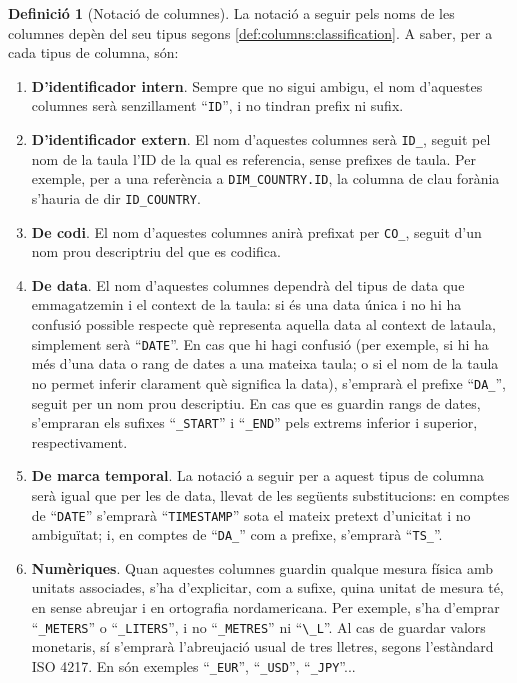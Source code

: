 \documentclass{article}
\theoremstyle{definition}
\newtheorem{definition}{Definició}
\begin{document}
\begin{definition}[Notació de columnes]\label{def:columns:notation}
La notació a seguir pels noms de les columnes depèn del seu tipus segons \cref{def:columns:classification}. A saber, per a cada tipus de columna, són:
\begin{enumerate}
  \item \textbf{D'identificador intern}. Sempre que no sigui ambigu, el nom d'aquestes columnes serà senzillament ``\verb|ID|'', i no tindran prefix ni sufix.

  \item \textbf{D'identificador extern}. El nom d'aquestes columnes serà \verb|ID_|, seguit pel nom de la taula l'ID de la qual es referencia, sense prefixes de taula. Per exemple, per a una referència a \verb|DIM_COUNTRY.ID|, la columna de clau forània s'hauria de dir \verb|ID_COUNTRY|.

  \item \textbf{De codi}. El nom d'aquestes columnes anirà prefixat per \verb|CO_|, seguit d'un nom prou descriptriu del que es codifica.

  \item \textbf{De data}. El nom d'aquestes columnes dependrà del tipus de data que emmagatzemin i el context de la taula: si és una data única i no hi ha confusió possible respecte què representa aquella data al context de lataula, simplement serà ``\verb|DATE|''. En cas que hi hagi confusió (per exemple, si hi ha més d'una data o rang de dates a una mateixa taula; o si el nom de la taula no permet inferir clarament què significa la data), s'emprarà el prefixe ``\verb|DA_|'', seguit per un nom prou descriptiu. En cas que es guardin rangs de dates, s'empraran els sufixes ``\verb|_START|'' i ``\verb|_END|'' pels extrems inferior i superior, respectivament.

  \item \textbf{De marca temporal}. La notació a seguir per a aquest tipus de columna serà igual que per les de data, llevat de les següents substitucions: en comptes de ``\verb|DATE|'' s'emprarà ``\verb|TIMESTAMP|'' sota el mateix pretext d'unicitat i no ambiguïtat; i, en comptes de ``\verb|DA_|'' com a prefixe, s'emprarà ``\verb|TS_|''.

  \item \textbf{Numèriques}. Quan aquestes columnes guardin qualque mesura física amb unitats associades, s'ha d'explicitar, com a sufixe, quina unitat de mesura té, en sense abreujar i en ortografia nordamericana. Per exemple, s'ha d'emprar ``\verb|_METERS|'' o ``\verb|_LITERS|'', i no ``\verb|_METRES|'' ni ``\verb|\_L|''. Al cas de guardar valors monetaris, sí s'emprarà l'abreujació usual de tres lletres, segons l'estàndard ISO 4217. En són exemples ``\verb|_EUR|'', ``\verb|_USD|'', ``\verb|_JPY|''...


\end{enumerate}
\end{definition}
\end{document}
